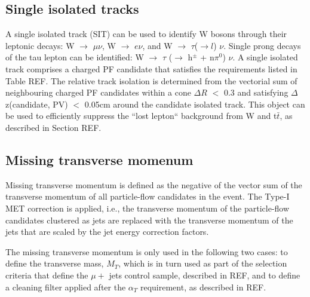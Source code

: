 \subsection{Single isolated tracks}
A single isolated track (SIT) can be used to identify W bosons through their leptonic decays: W $\rightarrow$ $\mu \nu$, W $\rightarrow$ $e\nu$, and W $\rightarrow$ $\tau$($\rightarrow l$) $\nu$. Single prong decays of the tau lepton can be identified: W $\rightarrow$ $\tau$ ($\rightarrow$ h$^{\pm}$ + n$\pi^{0}$) $\nu$. A single isolated track comprises a charged PF candidate that satisfies the requirements listed in Table REF. The relative track isolation is determined from the vectorial sum of neighbouring charged PF candidates within a cone $\Delta R$ $<$ 0.3 and satisfying $\Delta$z(candidate, PV) $<$ 0.05cm around the candidate isolated track.
This object can be used to efficiently suppress the ``lost lepton`` background from W and t$\bar{t}$, as described in Section REF. 

\subsection{Missing transverse momenum}

Missing transverse momentum is defined as the negative of the vector sum
of the transverse momentum of all particle-flow candidates in the event.
The Type-I MET correction is applied, i.e., the transverse momentum of
the particle-flow candidates clustered as jets are replaced with the
transverse momentum of the jets that are scaled by the jet energy
correction factors.

The missing transverse momentum is only used in the following two cases:
to define the transverse mass, $M_{T}$, which is in turn used as part of
the selection criteria that define the $\mu +$ jets control sample,
described in REF, and to define a cleaning filter applied after the
$\alpha_{T}$ requirement, as described in REF.


